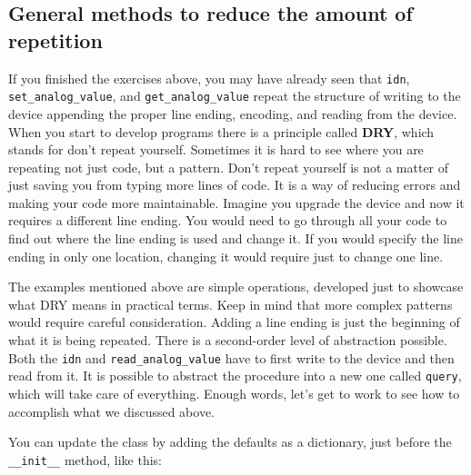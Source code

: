 

\subsection{General methods to reduce the amount
of repetition}\label{general-methods-to-reduce-the-amount-ofrepetition}

If you finished the exercises above, you may have already seen that \texttt{idn}, \texttt{set_analog_value}, and \texttt{get_analog_value} repeat the structure of writing to the
device appending the proper line ending, encoding, and reading from the device.
When you start to develop programs there is a principle called \textbf{DRY}, which stands for don't repeat yourself. Sometimes it is hard to see where you are repeating not just code, but a pattern. Don't repeat yourself is not a matter of just saving you from typing more lines of code. It is a way of reducing errors and making your code more maintainable. Imagine you upgrade the device and now it requires a different line ending. You would need to go through all your code to find out where the line ending is used and change it. If you would specify the line ending in only one location, changing it would require just to change one line. 

The examples mentioned above are simple operations, developed just to showcase what DRY means in practical terms. Keep in mind that more complex patterns would require careful consideration. Adding a line ending is just the beginning of what it is being repeated. There is a second-order level of abstraction possible. Both the \texttt{idn} and \texttt{read_analog_value} have to first write to the device and then read from it. It is possible to abstract the procedure into a new one called
\texttt{query}, which will take care of everything. Enough words, let's get to work to see how to accomplish what we discussed above.

You can update the class by adding the defaults as a dictionary, just
before the \texttt{__init__} method, like this:

